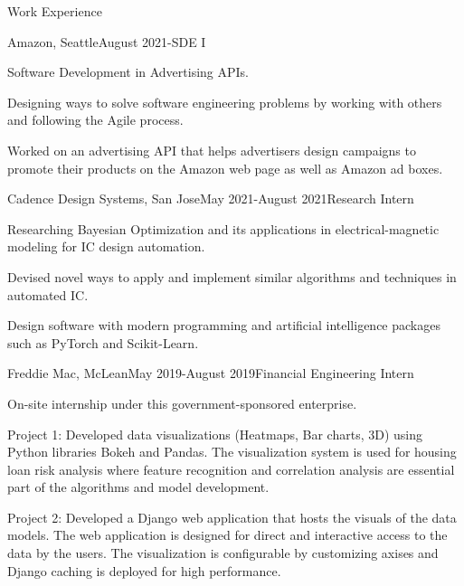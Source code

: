 \documentclass{resume} %
\begin{document}

\begin{rSection}{Work Experience}

\begin{rSubsection}{Amazon, Seattle}{August 2021-}{SDE I}{} 
    \item Software Development in Advertising APIs. 
    \item Designing ways to solve software engineering problems by working with others and following the Agile process. 
    \item Worked on an advertising API that helps advertisers design campaigns to promote their products on the Amazon web page as well as Amazon ad boxes.
\end{rSubsection}

\begin{rSubsection}{Cadence Design Systems, San Jose}{May 2021-August 2021}{Research Intern}{} 
    \item Researching Bayesian Optimization and its applications in electrical-magnetic modeling for IC design automation. 
    \item Devised novel ways to apply and implement similar algorithms and techniques in automated IC. 
    \item Design software with modern programming and artificial intelligence packages such as PyTorch and Scikit-Learn.
\end{rSubsection}

\begin{rSubsection}{Freddie Mac, McLean}{May 2019-August 2019}{Financial Engineering Intern}{} 
    \item On-site internship under this government-sponsored enterprise.
    \item Project 1: Developed data visualizations (Heatmaps, Bar charts, 3D) using Python libraries Bokeh and Pandas. The visualization system is used for housing loan risk analysis where feature recognition and correlation analysis are essential part of the algorithms and model development.
    \item Project 2: Developed a Django web application that hosts the visuals of the data models. The web application is designed for direct and interactive access to the data by the users. The visualization is configurable by customizing axises and Django caching is deployed for high performance.
\end{rSubsection}


\end{rSection}
\end{document}
